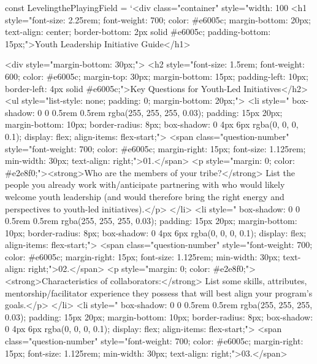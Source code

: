   const LevelingthePlayingField = `<div class="container" style="width: 100%
        <h1 style="font-size: 2.25rem; font-weight: 700; color: #e6005c; margin-bottom: 20px; text-align: center; border-bottom: 2px solid #e6005c; padding-bottom: 15px;">Youth Leadership Initiative Guide</h1>

        <div style="margin-bottom: 30px;">
            <h2 style="font-size: 1.5rem; font-weight: 600; color: #e6005c; margin-top: 30px; margin-bottom: 15px; padding-left: 10px; border-left: 4px solid #e6005c;">Key Questions for Youth-Led Initiatives</h2>
            <ul style="list-style: none; padding: 0; margin-bottom: 20px;">
                <li style="  box-shadow: 0 0 0.5rem 0.5rem rgba(255, 255, 255, 0.03); padding: 15px 20px; margin-bottom: 10px; border-radius: 8px; box-shadow: 0 4px 6px rgba(0, 0, 0, 0.1); display: flex; align-items: flex-start;">
                    <span class="question-number" style="font-weight: 700; color: #e6005c; margin-right: 15px; font-size: 1.125rem; min-width: 30px; text-align: right;">01.</span>
                    <p style="margin: 0; color: #e2e8f0;"><strong>Who are the members of your tribe?</strong> List the people you already work with/anticipate partnering with who would likely welcome youth leadership (and would therefore bring the right energy and perspectives to youth-led initiatives).</p>
                </li>
                <li style="  box-shadow: 0 0 0.5rem 0.5rem rgba(255, 255, 255, 0.03); padding: 15px 20px; margin-bottom: 10px; border-radius: 8px; box-shadow: 0 4px 6px rgba(0, 0, 0, 0.1); display: flex; align-items: flex-start;">
                    <span class="question-number" style="font-weight: 700; color: #e6005c; margin-right: 15px; font-size: 1.125rem; min-width: 30px; text-align: right;">02.</span>
                    <p style="margin: 0; color: #e2e8f0;"><strong>Characteristics of collaborators:</strong> List some skills, attributes, mentorship/facilitator experience they possess that will best align your program’s goals.</p>
                </li>
                <li style="  box-shadow: 0 0 0.5rem 0.5rem rgba(255, 255, 255, 0.03); padding: 15px 20px; margin-bottom: 10px; border-radius: 8px; box-shadow: 0 4px 6px rgba(0, 0, 0, 0.1); display: flex; align-items: flex-start;">
                    <span class="question-number" style="font-weight: 700; color: #e6005c; margin-right: 15px; font-size: 1.125rem; min-width: 30px; text-align: right;">03.</span>
